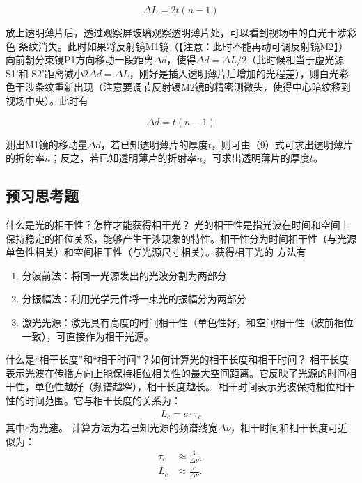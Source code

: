 \documentclass[dvipsnames, svgnames,a4paper,11pt]{article}
\begin{document}
\begin{question}
\[
\Delta L = 2t(n-1) \tag{8}
\]

放上透明薄片后，透过观察屏玻璃观察透明薄片处，可以看到视场中的白光干涉彩色
条纹消失。此时如果将反射镜M1镜（【注意：此时不能再动可调反射镜M2】）向前朝分束镜P1方向移动一段距离\(\Delta d\)，使得\(\Delta d = \Delta L/2\)（此时候相当于虚光源 S1'和 S2'距离减小\(2\Delta d = \Delta L\)，刚好是插入透明薄片后增加的光程差），则白光彩色干涉条纹重新出现（注意要调节反射镜M2镜的精密测微头，使得中心暗纹移到视场中央）。此时有

\[
\Delta d = t(n-1)\tag{9}
\]

测出M1镜的移动量\(\Delta d\)，若已知透明薄片的厚度\(t\)，则可由（9）式可求出透明薄片的折射率\(n\)；反之，若已知透明薄片的折射率\(n\)，可求出透明薄片的厚度\(t\)。
\end{question}
\subsection{预习思考题}
\begin{question}
    什么是光的相干性？怎样才能获得相干光？
	\tcblower
	光的相干性是指光波在时间和空间上保持稳定的相位关系，能够产生干涉现象的特性。相干性分为时间相干性（与光源单色性相关）和空间相干性（与光源尺寸相关）。获得相干光的
	方法有
	\begin{enumerate}
		\item 分波前法：将同一光源发出的光波分割为两部分
		\item 分振幅法：利用光学元件将一束光的振幅分为两部分
		\item 激光光源：激光具有高度的时间相干性（单色性好，和空间相干性（波前相位一致），可直接作为相干光源。
	\end{enumerate}
\end{question}

\begin{question}
    什么是“相干长度”和“相干时间”？如何计算光的相干长度和相干时间？
	\tcblower
	相干长度表示光波在传播方向上能保持相位相关性的最大空间距离。它反映了光源的时间相干性，单色性越好（频谱越窄），相干长度越长。
	相干时间表示光波保持相位相干性的时间范围。它与相干长度的关系为：
	\begin{align*}
	L_c = c \cdot \tau_c
	\end{align*}
	其中$c$为光速。
	计算方法为若已知光源的频谱线宽$\Delta \nu$，相干时间和相干长度可近似为：
	\begin{align*}
	\tau_c &\approx \frac{1}{\Delta \nu}, \\
	L_c &\approx \frac{c}{\Delta \nu}.
	\end{align*}
\end{question}
\end{document}
